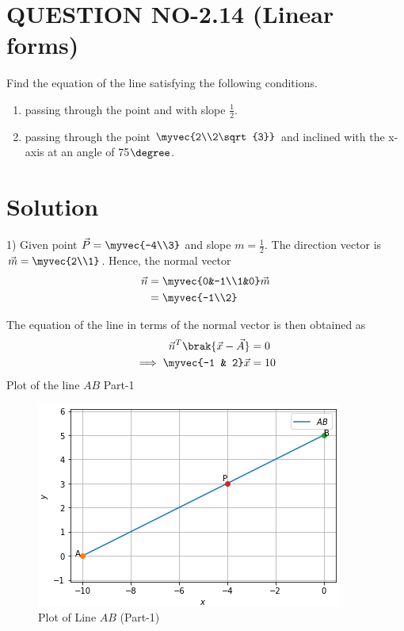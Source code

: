 \documentclass[journal,12pt,twocolumn]{IEEEtran}
\begin{document}
%
\section{QUESTION NO-2.14 (Linear forms)}
\item Find the equation of the line satisfying the following conditions.
\begin{enumerate}
\item passing through the point  and with slope $\frac{1}{2}$.
\item passing through the point $\myvec{2\\2\sqrt{3}}$ and inclined with the x-axis at an angle of 75$\degree$.
\end{enumerate}
%

%
\section{Solution}
1) Given point $\vec{P} = \myvec{-4\\3}$ and slope $m = \frac{1}{2}$.
The direction vector is $\vec{m} = \myvec{2\\1}$.  
Hence, the normal vector
\begin{align}
\label{eq:line_norm_dir}
\vec{n} &= \myvec{0&-1\\1&0}\vec{m} 
\\
&= \myvec{-1\\2}
\end{align}

The equation of the line in terms of the normal vector is then obtained as
\begin{align}
\label{eq:line_norm_vec}
\vec{n}^T\brak{\vec{x}-\vec{A}} &= 0
\\
\implies \myvec{-1 & 2} \vec{x} &= 10
\end{align}
Plot of the line $AB$ Part-1
\begin{figure}[ht]
    \centering
    \includegraphics[width=\columnwidth]{Line_Plot_Part1.PNG}
    \caption{Plot of Line $AB$ (Part-1)}
\end{figure}
\end{document}
